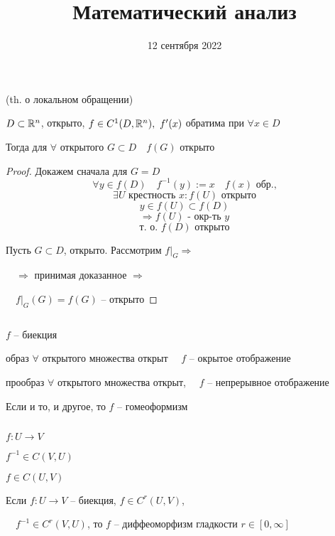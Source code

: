 


    \title{Математический анализ}
    \date{12 сентября 2022}
    \maketitle{}

    \pagebreak

    \begin{corollary}
        (th. о локальном обращении)
        \par $D \subset \mathbb{R}^n$,  открыто, $f \in C^1(D, \mathbb{R}^n), \ f'(x)$ обратима при $\forall x \in D$
        \par Тогда для $\forall$ открытого $G \subset D \quad f(G)$ открыто
    \end{corollary}
    \begin{proof}
        Докажем сначала для $G = D$
        \[ \forall y \in f(D) \quad f^{-1}(y) := x \quad f(x) \text{ обр.,} \]
        \[ \exists U \text{ крестность } x : f(U) \text{ открыто} \]
        \[ y \in f(U) \subset f(D) \]
        \[ \Rightarrow f(U) \text{ - окр-ть } y \]
        \[\text{т. о. } f(D) \text{ открыто}\]
        \par Пусть $G \subset D$, открыто. Рассмотрим $f\big|_G \Rightarrow$
        \par $\quad \Rightarrow$ принимая доказанное $\Rightarrow$
        \par $\quad f\big|_G(G) = f(G)$ -- открыто
    \end{proof}

    $ $
    \linebreak
    \par $f$ -- биекция
    \par образ $\forall$ открытого множества открыт $\quad f$ -- окрытое отображение
    \par прообраз $\forall$ открытого множества открыт, $\quad f$ -- непрерывное отображение

    \begin{definition}
        Если и то, и другое, то $f$ -- гомеоформизм
    \end{definition}

    $ $
    \par $f : U \rightarrow V$
    \par $f^{-1} \in C(V, U)$
    \par $f \in C(U, V)$

    \begin{definition}
        Если $f : U \rightarrow V$ -- биекция, $f \in C^r(U, V)$,
        \par $\quad f^{-1} \in C^r(V, U)$, то $f$ -- диффеоморфизм гладкости $r \in [0, \infty]$
    \end{definition}

